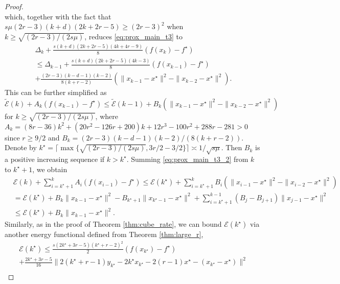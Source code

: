 \documentclass[twoside,11pt]{article}
\begin{document}
\begin{proof}
\begin{equation}
\end{equation}
which, together with the fact that $s\mu(2r-3)(k+d)(2k+2r-5) \geq (2r-3)^2$ when $k\geq \sqrt{(2r-3)/(2s\mu)}$, reduces \eqref{eq:prox_main_t3} to
\begin{multline}\nonumber%
\Delta_k + \frac{s(k+d)(2k+2r-5)(4k+4r-9)}{8}(f(x_k)-f^\star)\\
\le \Delta_{k-1} + \frac{s(k+d)(2k+2r-5)(4k-3)}{8}(f(x_{k-1})-f^\star) \\+ \frac{(2r-3)(k-d-1)(k-2)}{8(k+r-2)}(\|x_{k-1} - x^\star\|^2 - \|x_{k-2} - x^\star\|^2).
\end{multline}
This can be further simplified as
\begin{equation}\label{eq:prox_main_t3_2}
\tilde{\mathcal{E}}(k) + A_k(f(x_{k-1})-f^\star) \le \tilde{\mathcal{E}}(k-1) + B_k(\|x_{k-1} - x^\star\|^2 - \|x_{k-2} - x^\star\|^2)
\end{equation}
for $k\geq \sqrt{(2r-3)/(2s\mu)}$, where $A_k = (8r-36)k^2+(20r^2-126r+200)k+12r^3-100r^2+288r-281 > 0$ since $r\geq 9/2$ and $B_k = (2r-3)(k-d-1)(k-2)/(8(k+r-2))$. Denote by $k^\star = \lceil\max\{\sqrt{(2r-3)/(2s\mu)}, 3r/2-3/2\}\rceil \asymp 1/\sqrt{s\mu}$. Then $B_k$ is a positive increasing sequence if $k > k^\star$. Summing \eqref{eq:prox_main_t3_2} from $k$ to $k^\star + 1$, we obtain
\begin{equation}\nonumber
\begin{aligned}
&\mathcal{E}(k) + \sum_{i=k^\star+1}^k A_i(f(x_{i-1}) - f^\star) \le \mathcal{E}(k^\star) + \sum_{i=k^\star+1}^k B_i(\|x_{i-1} - x^\star\|^2 - \|x_{i-2} - x^\star\|^2)\\
& = \mathcal{E}(k^\star) + B_k\|x_{k-1} - x^\star\|^2 - B_{k^\star+1}\|x_{k^\star-1} - x^\star\|^2 + \sum_{i=k^\star+1}^{k-1} (B_{j} - B_{j+1})\|x_{j-1} - x^\star\|^2\\
&\le \mathcal{E}(k^\star) + B_k\|x_{k-1} - x^\star\|^2.
\end{aligned}
\end{equation}
Similarly, as in the proof of Theorem \ref{thm:cube_rate}, we can bound $\mathcal{E}(k^\star)$ via another energy functional defined from Theorem \ref{thm:large_r},
\begin{multline}\label{eq:ener_dis_bound1}
\mathcal{E}(k^\star) \le \frac{s(2k^\star+3r-5)(k^\star+r-2)^2}{2}(f(x_{k^\star}) - f^\star) \\+ \frac{2k^\star+3r-5}{16}\|2(k^\star+r-1)y_{k^\star} - 2k^\star x_{k^\star} - 2(r-1)x^\star -(x_{k^\star} - x^\star)\|^2\\

\end{multline}
\end{proof}
\end{document}
